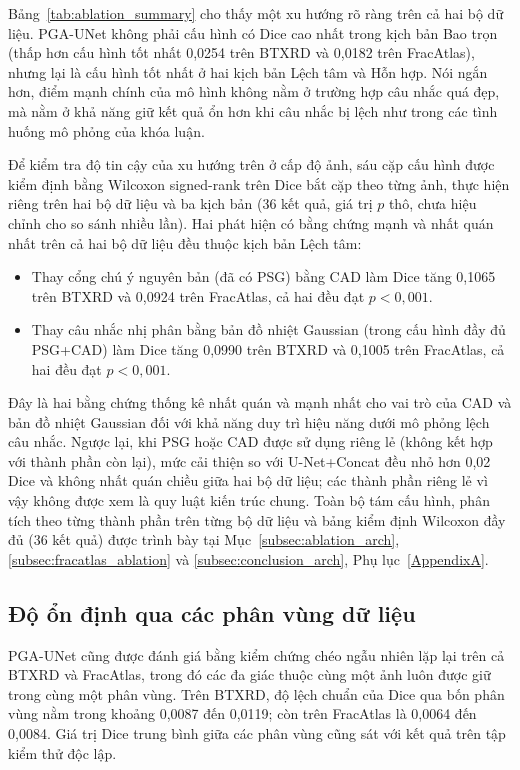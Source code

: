 Bảng~\ref{tab:ablation_summary} cho thấy một xu hướng rõ ràng trên cả hai bộ dữ liệu. PGA-UNet không phải cấu hình có Dice cao nhất trong kịch bản Bao trọn (thấp hơn cấu hình tốt nhất 0,0254 trên BTXRD và 0,0182 trên FracAtlas), nhưng lại là cấu hình tốt nhất ở hai kịch bản Lệch tâm và Hỗn hợp. Nói ngắn hơn, điểm mạnh chính của mô hình không nằm ở trường hợp câu nhắc quá đẹp, mà nằm ở khả năng giữ kết quả ổn hơn khi câu nhắc bị lệch như trong các tình huống mô phỏng của khóa luận.

Để kiểm tra độ tin cậy của xu hướng trên ở cấp độ ảnh, sáu cặp cấu hình được kiểm định bằng Wilcoxon signed-rank trên Dice bắt cặp theo từng ảnh, thực hiện riêng trên hai bộ dữ liệu và ba kịch bản (36 kết quả, giá trị $p$ thô, chưa hiệu chỉnh cho so sánh nhiều lần). Hai phát hiện có bằng chứng mạnh và nhất quán nhất trên cả hai bộ dữ liệu đều thuộc kịch bản Lệch tâm:
\begin{itemize}
    \item Thay cổng chú ý nguyên bản (đã có PSG) bằng CAD làm Dice tăng 0,1065 trên BTXRD và 0,0924 trên FracAtlas, cả hai đều đạt $p<0{,}001$.
    \item Thay câu nhắc nhị phân bằng bản đồ nhiệt Gaussian (trong cấu hình đầy đủ PSG+CAD) làm Dice tăng 0,0990 trên BTXRD và 0,1005 trên FracAtlas, cả hai đều đạt $p<0{,}001$.
\end{itemize}

Đây là hai bằng chứng thống kê nhất quán và mạnh nhất cho vai trò của CAD và bản đồ nhiệt Gaussian đối với khả năng duy trì hiệu năng dưới mô phỏng lệch câu nhắc. Ngược lại, khi PSG hoặc CAD được sử dụng riêng lẻ (không kết hợp với thành phần còn lại), mức cải thiện so với U-Net+Concat đều nhỏ hơn 0,02 Dice và không nhất quán chiều giữa hai bộ dữ liệu; các thành phần riêng lẻ vì vậy không được xem là quy luật kiến trúc chung. Toàn bộ tám cấu hình, phân tích theo từng thành phần trên từng bộ dữ liệu và bảng kiểm định Wilcoxon đầy đủ (36 kết quả) được trình bày tại Mục~\ref{subsec:ablation_arch}, \ref{subsec:fracatlas_ablation} và \ref{subsec:conclusion_arch}, Phụ lục~\ref{AppendixA}.

\subsection{Độ ổn định qua các phân vùng dữ liệu}
\label{subsec:summary_cv}

PGA-UNet cũng được đánh giá bằng kiểm chứng chéo ngẫu nhiên lặp lại trên cả BTXRD và FracAtlas, trong đó các đa giác thuộc cùng một ảnh luôn được giữ trong cùng một phân vùng. Trên BTXRD, độ lệch chuẩn của Dice qua bốn phân vùng nằm trong khoảng 0,0087 đến 0,0119; còn trên FracAtlas là 0,0064 đến 0,0084. Giá trị Dice trung bình giữa các phân vùng cũng sát với kết quả trên tập kiểm thử độc lập.

